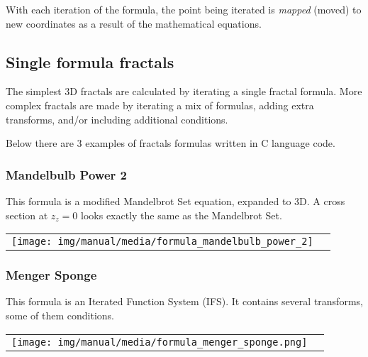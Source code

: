 With each iteration of the formula, the point being iterated is \emph{mapped} (moved) to new coordinates as a result of the mathematical equations.  

\subsection{Single formula fractals}\label{single-formula-fractals}

The simplest 3D fractals are calculated by iterating a single fractal formula. More complex fractals are made by iterating a mix of formulas, adding extra transforms, and/or including additional conditions. 

Below there are 3 examples of fractals formulas written in C language code.

\subsubsection{Mandelbulb Power 2} \nopagebreak

This formula is a modified Mandelbrot Set equation, expanded to 3D.
A cross section at $ z_z = 0 $ looks exactly the same as the Mandelbrot Set.
\nopagebreak

\begin{tabular}{l l}
	\texttt{[image: img/manual/media/formula\_mandelbulb\_power\_2]}	
	& 
	\begin{minipage}[b]{0.5\linewidth}
		
	\end{minipage}
\end{tabular} 

\subsubsection{Menger Sponge} \nopagebreak

This formula is an Iterated Function System (IFS). It contains several
transforms, some of them conditions. \nopagebreak

\begin{tabular}{l l}
	\texttt{[image: img/manual/media/formula\_menger\_sponge.png]}	
	& 
	\begin{minipage}[b]{0.5\linewidth}
		
	\end{minipage}
\end{tabular} 

